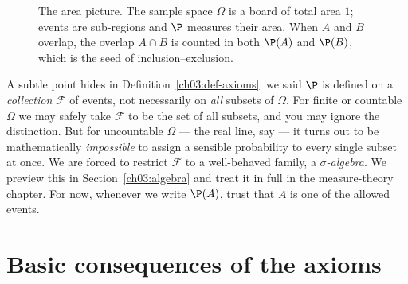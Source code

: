 \begin{figure}[H]
\centering
{}
\caption{The area picture. The sample space $\Omega$ is a board of total area
$1$; events are sub-regions and $\P$ measures their area. When $A$ and $B$
overlap, the overlap $A\cap B$ is counted in both $\P(A)$ and $\P(B)$, which is
the seed of inclusion--exclusion.}
\label{ch03:fig-area}
\end{figure}

\begin{formalbox}
A subtle point hides in Definition~\ref{ch03:def-axioms}: we said $\P$ is defined
on a \emph{collection} $\mathcal{F}$ of events, not necessarily on \emph{all}
subsets of $\Omega$. For finite or countable $\Omega$ we may safely take
$\mathcal{F}$ to be the set of all subsets, and you may ignore the distinction.
But for uncountable $\Omega$ --- the real line, say --- it turns out to be
mathematically \emph{impossible} to assign a sensible probability to every single
subset at once. We are forced to restrict $\mathcal{F}$ to a well-behaved family,
a \emph{$\sigma$-algebra}. We preview this in Section~\ref{ch03:algebra} and treat
it in full in the measure-theory chapter. For now, whenever we write $\P(A)$,
trust that $A$ is one of the allowed events.
\end{formalbox}

\section{Basic consequences of the axioms}
\label{ch03:consequences}

